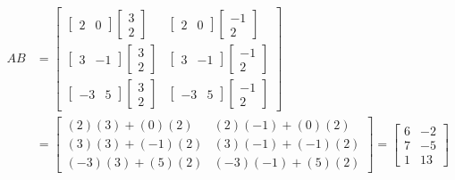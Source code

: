 \begin{example}
\begin{align*}
	AB & = 
	\begin{bmatrix}	
\begin{bmatrix}
 2 & 0 
\end{bmatrix}
\begin{bmatrix}
 3 \\ 2 
\end{bmatrix} & 
\begin{bmatrix}
 2 & 0 
\end{bmatrix}
\begin{bmatrix}
 -1 \\ 2 
\end{bmatrix} \\[8pt]
\begin{bmatrix}
3 & -1
\end{bmatrix}
\begin{bmatrix}
 3 \\ 2 
\end{bmatrix} & 
\begin{bmatrix}
3 & -1
\end{bmatrix}
\begin{bmatrix}
 -1 \\ 2 
\end{bmatrix} \\[8pt]
\begin{bmatrix}
-3 & 5 
\end{bmatrix}
\begin{bmatrix}
 3 \\ 2 
\end{bmatrix} & 
\begin{bmatrix}
 -3 & 5 
\end{bmatrix}
\begin{bmatrix}
 -1 \\ 2 
\end{bmatrix} 
	\end{bmatrix} \\
	& = 
\begin{bmatrix}
	(2)(3) + (0)(2) & (2)(-1)+(0)(2) \\
	(3)(3) + (-1)(2) & (3)(-1) +(-1)(2) \\
	(-3)(3) + (5)(2) & (-3)(-1) +(5)(2) 
\end{bmatrix} = 
\begin{bmatrix}
	6 & -2 \\ 
	7 & -5 \\
	1 & 13 
\end{bmatrix}
\end{align*}
\end{example}


